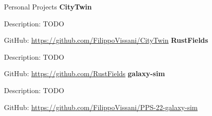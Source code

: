\begin{rubric}{Personal Projects}
\entry*[2023] \textbf{CityTwin}
\par Description: TODO
\par GitHub: \url{https://github.com/FilippoVissani/CityTwin}
%
\entry*[2023] \textbf{RustFields}
\par Description: TODO
\par GitHub: \url{https://github.com/RustFields}
%
\entry*[2022] \textbf{galaxy-sim}
\par Description: TODO
\par GitHub: \url{https://github.com/FilippoVissani/PPS-22-galaxy-sim}

\end{rubric}